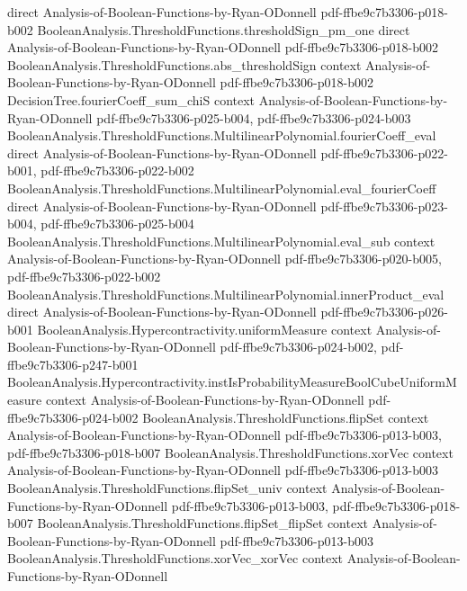 \begin{theorem}
  {direct}
  {Analysis-of-Boolean-Functions-by-Ryan-ODonnell}
  {pdf-ffbe9c7b3306-p018-b002}
\proofstep
  {BooleanAnalysis.ThresholdFunctions.thresholdSign_pm_one}
  {direct}
  {Analysis-of-Boolean-Functions-by-Ryan-ODonnell}
  {pdf-ffbe9c7b3306-p018-b002}
\proofstep
  {BooleanAnalysis.ThresholdFunctions.abs_thresholdSign}
  {context}
  {Analysis-of-Boolean-Functions-by-Ryan-ODonnell}
  {pdf-ffbe9c7b3306-p018-b002}
\proofstep
  {DecisionTree.fourierCoeff_sum_chiS}
  {context}
  {Analysis-of-Boolean-Functions-by-Ryan-ODonnell}
  {pdf-ffbe9c7b3306-p025-b004,
    pdf-ffbe9c7b3306-p024-b003}
\proofstep
  {BooleanAnalysis.ThresholdFunctions.MultilinearPolynomial.fourierCoeff_eval}
  {direct}
  {Analysis-of-Boolean-Functions-by-Ryan-ODonnell}
  {pdf-ffbe9c7b3306-p022-b001,
    pdf-ffbe9c7b3306-p022-b002}
\proofstep
  {BooleanAnalysis.ThresholdFunctions.MultilinearPolynomial.eval_fourierCoeff}
  {direct}
  {Analysis-of-Boolean-Functions-by-Ryan-ODonnell}
  {pdf-ffbe9c7b3306-p023-b004,
    pdf-ffbe9c7b3306-p025-b004}
\proofstep
  {BooleanAnalysis.ThresholdFunctions.MultilinearPolynomial.eval_sub}
  {context}
  {Analysis-of-Boolean-Functions-by-Ryan-ODonnell}
  {pdf-ffbe9c7b3306-p020-b005,
    pdf-ffbe9c7b3306-p022-b002}
\proofstep
  {BooleanAnalysis.ThresholdFunctions.MultilinearPolynomial.innerProduct_eval}
  {direct}
  {Analysis-of-Boolean-Functions-by-Ryan-ODonnell}
  {pdf-ffbe9c7b3306-p026-b001}
\proofstep
  {BooleanAnalysis.Hypercontractivity.uniformMeasure}
  {context}
  {Analysis-of-Boolean-Functions-by-Ryan-ODonnell}
  {pdf-ffbe9c7b3306-p024-b002,
    pdf-ffbe9c7b3306-p247-b001}
\proofstep
  {BooleanAnalysis.Hypercontractivity.instIsProbabilityMeasureBoolCubeUniformMeasure}
  {context}
  {Analysis-of-Boolean-Functions-by-Ryan-ODonnell}
  {pdf-ffbe9c7b3306-p024-b002}
\proofstep
  {BooleanAnalysis.ThresholdFunctions.flipSet}
  {context}
  {Analysis-of-Boolean-Functions-by-Ryan-ODonnell}
  {pdf-ffbe9c7b3306-p013-b003,
    pdf-ffbe9c7b3306-p018-b007}
\proofstep
  {BooleanAnalysis.ThresholdFunctions.xorVec}
  {context}
  {Analysis-of-Boolean-Functions-by-Ryan-ODonnell}
  {pdf-ffbe9c7b3306-p013-b003}
\proofstep
  {BooleanAnalysis.ThresholdFunctions.flipSet_univ}
  {context}
  {Analysis-of-Boolean-Functions-by-Ryan-ODonnell}
  {pdf-ffbe9c7b3306-p013-b003,
    pdf-ffbe9c7b3306-p018-b007}
\proofstep
  {BooleanAnalysis.ThresholdFunctions.flipSet_flipSet}
  {context}
  {Analysis-of-Boolean-Functions-by-Ryan-ODonnell}
  {pdf-ffbe9c7b3306-p013-b003}
\proofstep
  {BooleanAnalysis.ThresholdFunctions.xorVec_xorVec}
  {context}
  {Analysis-of-Boolean-Functions-by-Ryan-ODonnell}

\end{theorem}
